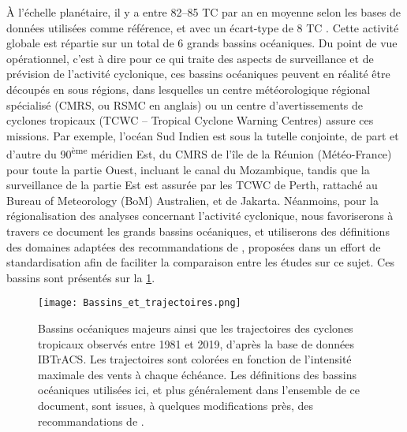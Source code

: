 \documentclass[../main.tex]{subfiles}
\begin{document}
À l'échelle planétaire, il y a entre \numrange[range-phrase ={ et }]{82}{85} TC par an en moyenne selon les bases de données utilisées comme référence, et avec un écart-type de \num{8} TC \parencite{schreck_impact_2014}. Cette activité globale est répartie sur un total de \num{6} grands bassins océaniques. Du point de vue opérationnel, c'est à dire pour ce qui traite des aspects de surveillance et de prévision de l'activité cyclonique, ces bassins océaniques peuvent en réalité être découpés
en sous régions, dans lesquelles un centre météorologique régional spécialisé (CMRS, ou RSMC en anglais) ou un centre d'avertissements de cyclones tropicaux (TCWC -- Tropical Cyclone Warning Centres) assure ces missions. Par exemple, l'océan Sud Indien est sous la tutelle conjointe, de part et d'autre du 90\textsuperscript{ème} méridien Est, du CMRS de l'île de la Réunion (Météo-France) pour toute la partie Ouest, incluant le canal du Mozambique, tandis que la surveillance de la partie Est est assurée par les TCWC de
Perth, rattaché au Bureau of Meteorology (BoM) Australien, et de Jakarta. Néanmoins, pour la régionalisation des analyses concernant l'activité cyclonique, nous favoriserons à travers ce document les grands bassins océaniques, et utiliserons des définitions des domaines adaptées des recommandations de \cite{knutson_tropical_2020}, proposées dans un effort de standardisation afin de faciliter la comparaison entre les études sur ce sujet. Ces bassins sont présentés sur la
\cref{fig:bassins_TC}.

\begin{figure}[t]
    \centering
    \texttt{[image: Bassins\_et\_trajectoires.png]}
    \caption{Bassins océaniques majeurs ainsi que les trajectoires des cyclones tropicaux observés entre 1981 et 2019, d'après la base de données \hbox{IBTrACS}. Les trajectoires sont colorées en fonction de l'intensité maximale des vents à chaque échéance. Les définitions des bassins océaniques utilisées ici, et plus généralement dans l'ensemble de ce document, sont issues, à quelques modifications près, des recommandations de \hbox{\cite[documents supplémentaires]{knutson_tropical_2020}}.}
    \label{fig:bassins_TC}
\end{figure}
\end{document}
